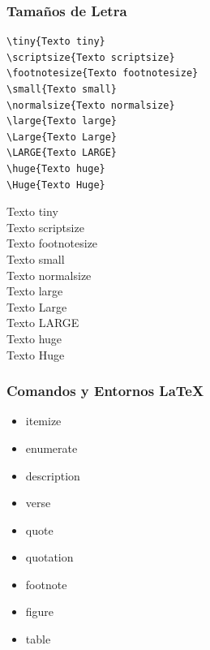 \documentclass[aspectratio=43]{beamer}%
\begin{document}
\begin{frame}[fragile]
\frametitle{\textbf{Tamaños de Letra}}
\justifying
 \begin{minipage}[l]{0.55\linewidth}
   \lstset{language=,basicstyle=\small}
   \vspace{-0.7cm}
\begin{lstlisting}
\tiny{Texto tiny}
\scriptsize{Texto scriptsize}
\footnotesize{Texto footnotesize}
\small{Texto small}
\normalsize{Texto normalsize}
\large{Texto large}
\Large{Texto Large}
\LARGE{Texto LARGE}
\huge{Texto huge}
\Huge{Texto Huge}
\end{lstlisting}\vspace{-0.3cm}

\end{minipage}\hfill
\begin{minipage}[r]{0.44\linewidth}\vspace{-0.5cm}
\tiny{Texto tiny}\\\vspace{-0.5cm}
\scriptsize{Texto scriptsize}\\\vspace{-0.5cm}
\footnotesize{Texto footnotesize}\\\vspace{-0.5cm}
\small{Texto small}\\\vspace{-0.5cm}
\normalsize{Texto normalsize}\\\vspace{-0.5cm}
\large{Texto large}\\\vspace{-0.5cm}
\Large{Texto Large}\\\vspace{-0.2cm}
\LARGE{Texto LARGE}\\\vspace{-0.3cm}
\huge{Texto huge}\\\vspace{-0.1cm}
\Huge{Texto Huge}
\end{minipage}

\end{frame}

\begin{frame}[fragile]
\frametitle{\textbf{Comandos y Entornos \LaTeX{}}}
\justifying
 \begin{itemize}\justifying
  \item itemize
  \item enumerate
  \item description
  \item verse
  \item quote
  \item quotation
  \item footnote
  \item figure
  \item table
\end{itemize}

\end{frame}
\end{document}
